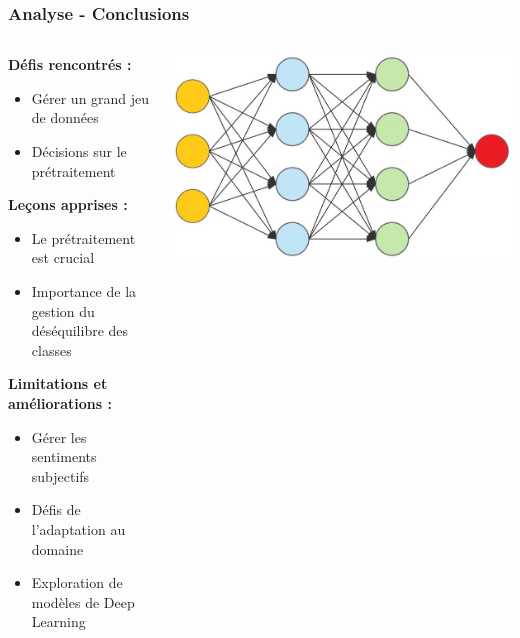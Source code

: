 \documentclass{beamer}
\begin{document}
\begin{frame}
\frametitle{Analyse - Conclusions}

\begin{columns}

\begin{column}{0.6\textwidth}
\textbf{Défis rencontrés :}
\begin{itemize}
\item Gérer un grand jeu de données
\item Décisions sur le prétraitement
\end{itemize}

\textbf{Leçons apprises :}
\begin{itemize}
\item Le prétraitement est crucial
\item Importance de la gestion du déséquilibre des classes
\end{itemize}

\textbf{Limitations et améliorations :}
\begin{itemize}
\item Gérer les sentiments subjectifs
\item Défis de l'adaptation au domaine
\item Exploration de modèles de Deep Learning
\end{itemize}

\end{column}

\begin{column}{0.5\textwidth}
\includegraphics[width=1\textwidth]{img_neural_networks.jpg}
\end{column}

\end{columns}

\end{frame}
\end{document}
